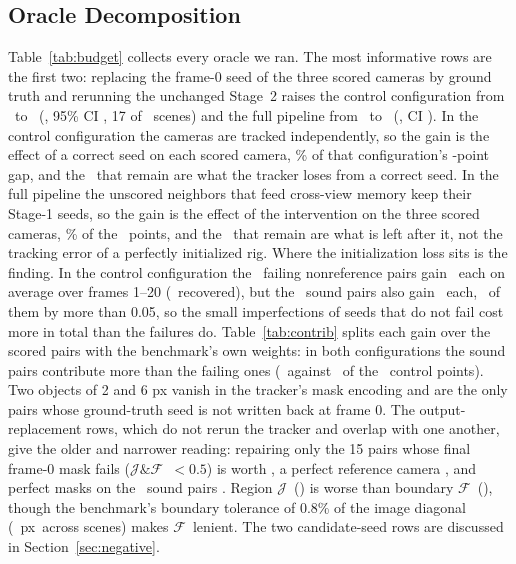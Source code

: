 \documentclass[journal]{IEEEtran}
\newcommand{\Jscore}{\ensuremath{\mathcal{J}}}
\newcommand{\Fscore}{\ensuremath{\mathcal{F}}}
\newcommand{\JFpair}{\ensuremath{\mathcal{J}\&\mathcal{F}}}
\newcommand{\px}{~px}
\begin{document}
\subsection{Oracle Decomposition}
Table~\ref{tab:budget} collects every oracle we ran. The most informative rows
are the first two: replacing the frame-0 seed of the three scored cameras by
ground truth and rerunning the unchanged Stage~2 raises the control
configuration from \controlBasic\ to \gtSeedControl\ (\gtSeedControlDelta,
95\% CI \gtSeedControlCI, 17 of \nScenes\ scenes) and the full pipeline from
\OursBasic\ to \gtSeedHeadline\ (\gtSeedHeadlineDelta, CI \gtSeedHeadlineCI).
In the control configuration the cameras are tracked independently, so the gain is the effect of a correct seed
on each scored camera, \gtSeedControlPct\% of that configuration's
\controlGap-point gap, and the \gtSeedControlRemaining\ that remain are what
the tracker loses from a correct seed. In the full pipeline the unscored
neighbors that feed cross-view memory keep their Stage-1 seeds, so the gain is
the effect of the intervention on the three scored cameras,
\gtSeedHeadlinePct\% of the \totalGap\ points, and the \gtSeedRemaining\ that
remain are what is left after it, not the tracking error of a perfectly
initialized rig. Where the initialization loss sits is the finding. In the control
configuration the \nFzero\ failing nonreference pairs gain \gtSeedFzeroGain\ each
on average over frames 1--20 (\gtSeedFzeroRec\ recovered), but the \nNzero\ sound
pairs also gain \gtSeedNzeroGain\ each, \gtSeedNzeroUp\ of them by more than 0.05,
so the small imperfections of seeds that do not fail cost more in total than
the failures do. Table~\ref{tab:contrib} splits each gain over the scored pairs with the
benchmark's own weights: in both configurations the sound pairs contribute
more than the failing ones (\gtSeedNzeroContribCtrl\ against
\gtSeedFzeroContribCtrl\ of the \gtSeedControlDelta\ control points). Two objects of 2 and 6 px vanish in
the tracker's mask encoding and are the only pairs whose ground-truth seed is
not written back at frame 0. The output-replacement rows, which do not rerun
the tracker and overlap with one another, give the older and narrower reading:
repairing only the 15 pairs whose final frame-0 mask fails (\JFpair\ ${<}0.5$)
is worth \oracleSeed, a perfect reference camera \oracleRef, and perfect masks
on the \nOrdinaryPairs\ sound pairs \oracleOrdinary. Region \Jscore\ (\regionJ)
is worse than boundary \Fscore\ (\boundaryF), though the benchmark's boundary
tolerance of 0.8\% of the image diagonal (\boundaryTol\px\ across scenes)
makes \Fscore\ lenient. The two candidate-seed rows are discussed in
Section~\ref{sec:negative}.
\end{document}
